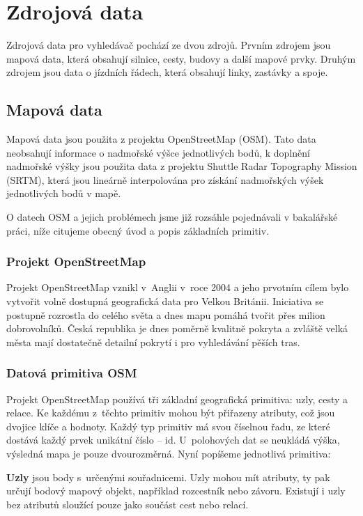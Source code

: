 \chapter{Zdrojová data}

Zdrojová data pro vyhledávač pochází ze dvou zdrojů. Prvním zdrojem jsou mapová
data, která obsahují silnice, cesty, budovy a další mapové prvky. Druhým zdrojem
jsou data o jízdních řádech, která obsahují linky, zastávky a spoje.

\section{Mapová data}
Mapová data jsou použita z projektu OpenStreetMap\cite{OSM} (OSM). Tato data neobsahují
informace o nadmořské výšce jednotlivých bodů, k doplnění nadmořské výšky jsou
použita data z projektu Shuttle Radar Topography Mission (SRTM), která jsou
lineárně interpolována pro získání nadmořských výšek jednotlivých bodů v mapě.

O datech OSM a jejich problémech jsme již rozsáhle pojednávali v bakalářské
práci\cite{bakalarka}, níže citujeme obecný úvod a popis základních primitiv. 
\newcommand{\tuc}{\bf}
\subsection{Projekt OpenStreetMap}
Projekt OpenStreetMap\cite{OSM} vznikl v~Anglii v~roce 2004 a jeho prvotním cílem bylo
vytvořit volně dostupná geografická data pro Velkou Británii. Iniciativa se
postupně rozrostla do celého světa a dnes mapu pomáhá tvořit přes milion
dobrovolníků. Česká republika je dnes poměrně kvalitně pokryta a zvláště velká
města mají dostatečně detailní pokrytí i pro vyhledávání pěších tras.

\subsection{Datová primitiva OSM} 
Projekt OpenStreetMap používá tři základní geografická primitiva: uzly, cesty a
relace. Ke každému z~těchto primitiv mohou být přiřazeny atributy, což jsou
dvojice klíče a hodnoty. Každý typ primitiv má svou číselnou řadu, ze které
dostává každý prvek unikátní číslo -- id. 
U~polohových dat se neukládá výška, výsledná mapa je pouze dvourozměrná.
Nyní popíšeme jednotlivá primitiva:

{\tuc Uzly} jsou body s~určenými souřadnicemi. Uzly mohou mít atributy, ty pak
určují bodový mapový objekt, například rozcestník nebo závoru. Existují i uzly
bez atributů sloužící pouze jako součást cest nebo relací.

